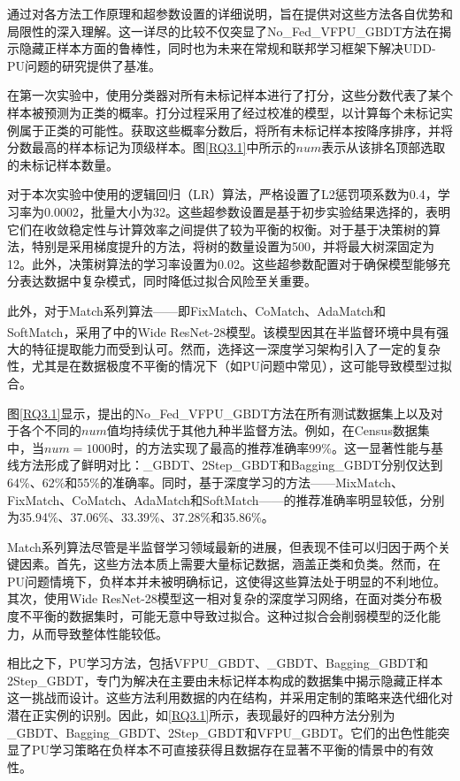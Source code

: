 通过对各方法工作原理和超参数设置的详细说明，旨在提供对这些方法各自优势和局限性的深入理解。这一详尽的比较不仅突显了No\_Fed\_VFPU\_GBDT方法在揭示隐藏正样本方面的鲁棒性，同时也为未来在常规和联邦学习框架下解决UDD-PU问题的研究提供了基准。

在第一次实验中，使用分类器对所有未标记样本进行了打分，这些分数代表了某个样本被预测为正类的概率。打分过程采用了经过校准的模型，以计算每个未标记实例属于正类的可能性。获取这些概率分数后，将所有未标记样本按降序排序，并将分数最高的样本标记为顶级样本。图\autoref{RQ3.1}中所示的$ num $表示从该排名顶部选取的未标记样本数量。

对于本次实验中使用的逻辑回归（LR）算法，严格设置了L2惩罚项系数为0.4，学习率为0.0002，批量大小为32。这些超参数设置是基于初步实验结果选择的，表明它们在收敛稳定性与计算效率之间提供了较为平衡的权衡。对于基于决策树的算法，特别是采用梯度提升的方法，将树的数量设置为500，并将最大树深固定为12。此外，决策树算法的学习率设置为0.02。这些超参数配置对于确保模型能够充分表达数据中复杂模式，同时降低过拟合风险至关重要。

此外，对于Match系列算法——即FixMatch、CoMatch、AdaMatch和SoftMatch，采用了\textsuperscript{\cite{oliver2018realistic}}中的Wide ResNet-28模型。该模型因其在半监督环境中具有强大的特征提取能力而受到认可。然而，选择这一深度学习架构引入了一定的复杂性，尤其是在数据极度不平衡的情况下（如PU问题中常见），这可能导致模型过拟合。

图\autoref{RQ3.1}显示，提出的No\_Fed\_VFPU\_GBDT方法在所有测试数据集上以及对于各个不同的$num$值均持续优于其他九种半监督方法。例如，在Census数据集中，当$num=1000$时，的方法实现了最高的推荐准确率99\%。这一显著性能与基线方法形成了鲜明对比：\_GBDT、2Step\_GBDT和Bagging\_GBDT分别仅达到64\%、62\%和55\%的准确率。同时，基于深度学习的方法——MixMatch、FixMatch、CoMatch、AdaMatch和SoftMatch——的推荐准确率明显较低，分别为35.94\%、37.06\%、33.39\%、37.28\%和35.86\%。

Match系列算法尽管是半监督学习领域最新的进展，但表现不佳可以归因于两个关键因素。首先，这些方法本质上需要大量标记数据，涵盖正类和负类。然而，在PU问题情境下，负样本并未被明确标记，这使得这些算法处于明显的不利地位。其次，使用Wide ResNet-28模型这一相对复杂的深度学习网络，在面对类分布极度不平衡的数据集时，可能无意中导致过拟合。这种过拟合会削弱模型的泛化能力，从而导致整体性能较低。

相比之下，PU学习方法，包括VFPU\_GBDT、\_GBDT、Bagging\_GBDT和2Step\_GBDT，专门为解决在主要由未标记样本构成的数据集中揭示隐藏正样本这一挑战而设计。这些方法利用数据的内在结构，并采用定制的策略来迭代细化对潜在正实例的识别。因此，如\autoref{RQ3.1}所示，表现最好的四种方法分别为\_GBDT、Bagging\_GBDT、2Step\_GBDT和VFPU\_GBDT。它们的出色性能突显了PU学习策略在负样本不可直接获得且数据存在显著不平衡的情景中的有效性。

